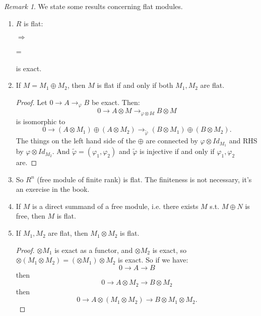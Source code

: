\documentclass[12pt]{amsbook}
\theoremstyle{plain}
\numberwithin{section}{chapter}
\numberwithin{equation}{chapter}
\theoremstyle{definition}
\theoremstyle{remark}
\newtheorem{rem}[theorem]{Remark}
\newcommand{\tens}{\otimes}
\renewcommand{\phi}{\varphi}
\begin{document}
\begin{rem} We state some results concerning flat modules. \\
\begin{enumerate}
\item $R$ is flat:
\begin{center}
\end{center}
$\Rightarrow$
\begin{center}
\end{center}
=
\begin{center}
\end{center}
is exact. 

\item If $M = M_1 \oplus M_2$, then $M$ is flat if and only if both $M_1,M_2$ are flat. 

\begin{proof}
Let $0 \rightarrow A \rightarrow_\phi B$ be exact. Then:
$$
0 \rightarrow A \tens M \rightarrow_{\phi \tens Id} B \tens M
$$ is isomorphic to
$$
0 \to (A \tens M_1) \oplus (A \tens M_2) \to_{\tilde{\phi}} (B \tens M_1) \oplus (B \tens M_2).
$$
The things on the left hand side of the $\oplus$ are connected by $\phi \tens Id_{M_1}$ and RHS by $\phi \tens Id_{M_2}$. And $\tilde{\phi} = (\phi_1,\phi_2)$ and $\tilde{\phi}$ is injective if and only if $\phi_1,\phi_2$ are. 
\end{proof}

\item So $R^n$ (free module of finite rank) is flat. The finiteness is not necessary, it's an exercise in the book. 
\item If $M$ is a direct summand of a free module, i.e. there exists $M$ s.t. $M \oplus N$ is free, then $M$ is flat. 

\item If $M_1,M_2$ are flat, then $M_1 \tens M_2$ is flat. 

\begin{proof}
$\tens M_1$ is exact as a functor, and $\tens M_2$ is exact, so $\tens (M_1 \tens M_2) = (\tens M_1) \tens M_2$ is exact. 
So if we have:
$$
0 \to A \to B
$$
 then
 $$
 0 \to A \tens M_2 \to B \tens M_2
 $$
  then 
  $$
  0 \to A \tens (M_1 \tens M_2) \to B \tens M_1 \tens M_2.
  $$


\end{proof}
\end{enumerate}
\end{rem}
\end{document}
